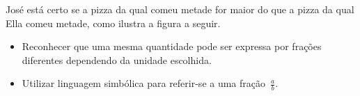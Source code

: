 \begin{multicols}{2}
\begin{solucao}{}{}
  José está certo se a pizza da qual comeu metade for maior do que a pizza da qual Ella comeu metade, como ilustra a figura a seguir.
  \begin{center}

  \end{center}

  \end{solucao}

\begin{objetivos}[label=chap2-ativ15]{}{}
\begin{itemize} %
    \item Reconhecer que uma mesma quantidade pode ser expressa por frações diferentes dependendo da unidade escolhida.
    \item Utilizar linguagem simbólica para referir-se a uma fração~$\frac{a}{b}$.
\end{itemize} %

\end{objetivos}


\end{multicols}
